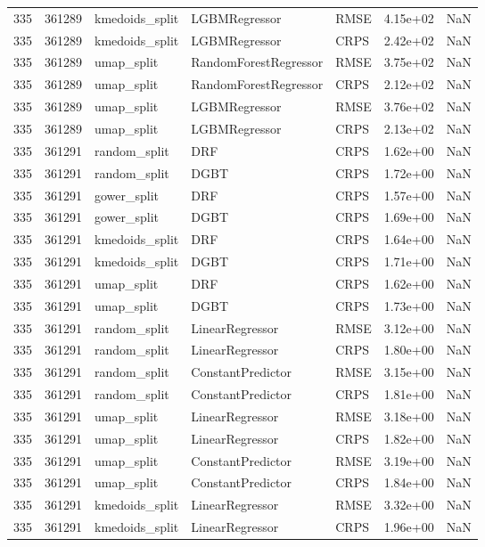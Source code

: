 \begin{tabular}{rrlllrr}
335 & 361289 & kmedoids\_split & LGBMRegressor & RMSE & 4.15e+02 & NaN \\
335 & 361289 & kmedoids\_split & LGBMRegressor & CRPS & 2.42e+02 & NaN \\
335 & 361289 & umap\_split & RandomForestRegressor & RMSE & 3.75e+02 & NaN \\
335 & 361289 & umap\_split & RandomForestRegressor & CRPS & 2.12e+02 & NaN \\
335 & 361289 & umap\_split & LGBMRegressor & RMSE & 3.76e+02 & NaN \\
335 & 361289 & umap\_split & LGBMRegressor & CRPS & 2.13e+02 & NaN \\
335 & 361291 & random\_split & DRF & CRPS & 1.62e+00 & NaN \\
335 & 361291 & random\_split & DGBT & CRPS & 1.72e+00 & NaN \\
335 & 361291 & gower\_split & DRF & CRPS & 1.57e+00 & NaN \\
335 & 361291 & gower\_split & DGBT & CRPS & 1.69e+00 & NaN \\
335 & 361291 & kmedoids\_split & DRF & CRPS & 1.64e+00 & NaN \\
335 & 361291 & kmedoids\_split & DGBT & CRPS & 1.71e+00 & NaN \\
335 & 361291 & umap\_split & DRF & CRPS & 1.62e+00 & NaN \\
335 & 361291 & umap\_split & DGBT & CRPS & 1.73e+00 & NaN \\
335 & 361291 & random\_split & LinearRegressor & RMSE & 3.12e+00 & NaN \\
335 & 361291 & random\_split & LinearRegressor & CRPS & 1.80e+00 & NaN \\
335 & 361291 & random\_split & ConstantPredictor & RMSE & 3.15e+00 & NaN \\
335 & 361291 & random\_split & ConstantPredictor & CRPS & 1.81e+00 & NaN \\
335 & 361291 & umap\_split & LinearRegressor & RMSE & 3.18e+00 & NaN \\
335 & 361291 & umap\_split & LinearRegressor & CRPS & 1.82e+00 & NaN \\
335 & 361291 & umap\_split & ConstantPredictor & RMSE & 3.19e+00 & NaN \\
335 & 361291 & umap\_split & ConstantPredictor & CRPS & 1.84e+00 & NaN \\
335 & 361291 & kmedoids\_split & LinearRegressor & RMSE & 3.32e+00 & NaN \\
335 & 361291 & kmedoids\_split & LinearRegressor & CRPS & 1.96e+00 & NaN \\

\end{tabular}
